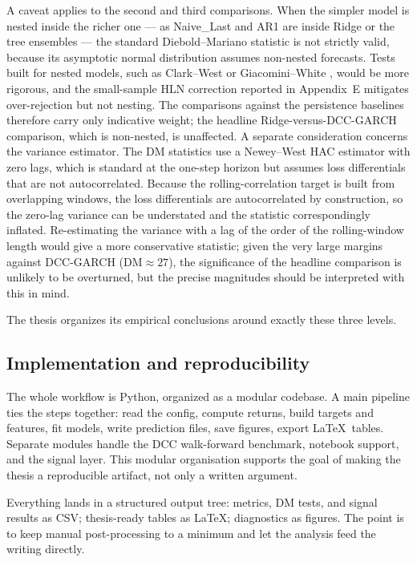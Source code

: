 A caveat applies to the second and third comparisons. When the simpler model is nested inside the richer one --- as Naive\_Last and AR1 are inside Ridge or the tree ensembles --- the standard Diebold--Mariano statistic is not strictly valid, because its asymptotic normal distribution assumes non-nested forecasts. Tests built for nested models, such as Clark--West or Giacomini--White \cite{clark2007nested,giacomini2006tests}, would be more rigorous, and the small-sample HLN correction reported in Appendix~E mitigates over-rejection but not nesting. The comparisons against the persistence baselines therefore carry only indicative weight; the headline Ridge-versus-DCC-GARCH comparison, which is non-nested, is unaffected. A separate consideration concerns the variance estimator. The DM statistics use a Newey--West HAC estimator with zero lags, which is standard at the one-step horizon but assumes loss differentials that are not autocorrelated. Because the rolling-correlation target is built from overlapping windows, the loss differentials are autocorrelated by construction, so the zero-lag variance can be understated and the statistic correspondingly inflated. Re-estimating the variance with a lag of the order of the rolling-window length would give a more conservative statistic; given the very large margins against DCC-GARCH ($\mathrm{DM}\approx 27$), the significance of the headline comparison is unlikely to be overturned, but the precise magnitudes should be interpreted with this in mind.

The thesis organizes its empirical conclusions around exactly these three levels.

\subsection{Implementation and reproducibility}

The whole workflow is Python, organized as a modular codebase. A main pipeline ties the steps together: read the config, compute returns, build targets and features, fit models, write prediction files, save figures, export \LaTeX\ tables. Separate modules handle the DCC walk-forward benchmark, notebook support, and the signal layer. This modular organisation supports the goal of making the thesis a reproducible artifact, not only a written argument.

Everything lands in a structured output tree: metrics, DM tests, and signal results as CSV; thesis-ready tables as \LaTeX; diagnostics as figures. The point is to keep manual post-processing to a minimum and let the analysis feed the writing directly.

